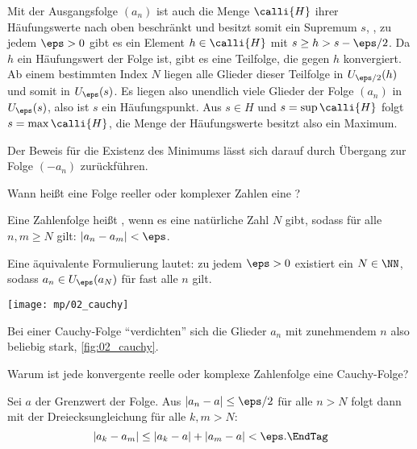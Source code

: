 \begin{antwort}
  Mit der Ausgangsfolge $(a_n)$ 
  ist auch die Menge $\calli{H}$ ihrer Häufungswerte nach 
  oben beschränkt und besitzt somit ein Supremum $s$, {\dasheisst},   
  zu jedem $\eps > 0$ gibt es ein Element $h\in \calli{H}$ mit 
  $s \ge h> s-\eps/2$. Da $h$ ein Häufungswert der Folge ist, 
  gibt es eine Teilfolge, die gegen $h$ konvergiert. Ab einem 
  bestimmten Index $N$ liegen alle Glieder dieser Teilfolge in 
  $U_{\eps/2}(h)$ und somit in $U_\eps(s)$. Es liegen also unendlich 
  viele Glieder der Folge $(a_n)$ in $U_\eps(s)$, also ist $s$ ein 
  Häufungspunkt. Aus $s\in H$ und $s=\sup \calli{H}$ folgt $s=\max \calli{H}$, 
  die Menge der Häufungswerte besitzt also ein Maximum. 

  Der Beweis für die Existenz des Minimums lässt sich darauf durch Übergang zur 
  Folge $(-a_n)$ zurückführen.
  \AntEnd
\end{antwort}

\begin{frage}%
  \label{02_cf}
  Wann heißt eine Folge reeller oder komplexer Zahlen eine 
  ?
\end{frage}  

\begin{antwort}
  Eine Zahlenfolge heißt , 
  wenn es eine natürliche Zahl 
  $N$ gibt, sodass für alle $n,m \ge N$ gilt: $|a_n - a_m|<\eps$.

  Eine äquivalente Formulierung lautet: zu jedem $\eps>0$ 
  existiert ein $N\in\NN$, sodass $a_n \in U_\eps(a_N)$ für 
  fast alle $n$ gilt.   

  \begin{center}
    \texttt{[image: mp/02\_cauchy]}
    \label{fig:02_cauchy}
  \end{center}
  Bei einer Cauchy-Folge "`verdichten"' sich die Glieder $a_n$ 
  mit zunehmendem $n$ also beliebig stark, \sieheAbbildung\ref{fig:02_cauchy}.  
  \AntEnd
\end{antwort}

\begin{frage}%
  \label{02_cfa}
  Warum ist jede konvergente reelle oder komplexe Zahlenfolge eine 
  Cauchy-Folge?
\end{frage}

\begin{antwort}
  Sei $a$ der Grenzwert der Folge. Aus $|a_n-a|\le \eps/2$ für alle 
  $n>N$ folgt dann mit der Dreiecksungleichung für alle $k,m > N$:
  \begin{equation}
    |a_k-a_m| \le | a_k -a | + | a_m-a | < \eps.  \EndTag
  \end{equation}
\end{antwort}


